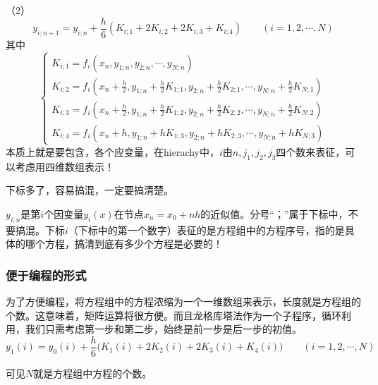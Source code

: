 （2）
$$y_{i;n+1}=y_{i;n}+\frac{h}{6}(K_{i;1}+2K_{i;2}+2K_{i;3}+K_{i;4}) \qquad (i=1,2,\cdots,N)$$
其中
$$\begin{cases}
K_{i;1}=f_i(x_n,y_{1;n},y_{2;n},\cdots,y_{N;n})\\
K_{i;2}=f_i(x_n+\frac{h}{2},y_{1;n}+\frac{h}{2}K_{1;1},y_{2;n}+\frac{h}{2}K_{2;1},\cdots,y_{N;n}+\frac{h}{2}K_{N;1})\\
K_{i;3}=f_i(x_n+\frac{h}{2},y_{1;n}+\frac{h}{2}K_{1;2},y_{2;n}+\frac{h}{2}K_{2;2},\cdots,y_{N;n}+\frac{h}{2}K_{N;2})\\
K_{i;4}=f_i(x_n+h,y_{1;n}+hK_{1;3},y_{2;n}+hK_{2;3},\cdots,y_{N;n}+hK_{N;3})
\end{cases}
$$
{\color{red}本质上就是要包含，各个应变量，在hierachy中，$i$由$n,j_1,j_2,j_3$四个数来表征，可以考虑用四维数组表示！}

下标多了，容易搞混，一定要搞清楚。

$y_{i;n}$是第$i$个因变量$y_i(x)$在节点$x_n=x_0+nh$的近似值。分号“；”属于下标中，不要搞混。下标$i$（下标中的第一个数字）表征的是方程组中的方程序号，指的是具体的哪个方程，搞清到底有多少个方程是必要的！



\subsubsection{便于编程的形式}
为了方便编程，将方程组中的方程浓缩为一个一维数组来表示，长度就是方程组的个数。这意味着，矩阵运算将很方便。而且龙格库塔法作为一个子程序，循环利用，我们只需考虑第一步和第二步，始终是前一步是后一步的初值。
$$y_{1}(i)=y_{0}(i)+\frac{h}{6}\Big(K_{1}(i)+2K_{2}(i)+2K_{3}(i)+K_{4}(i)\Big) \qquad (i=1,2,\cdots,N)$$

可见$N$就是方程组中方程的个数。

